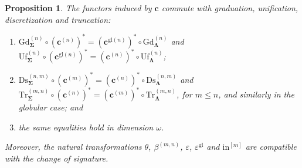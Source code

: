 \documentclass[a4paper,reqno]{amsart}
\newcommand{\sig}[1]{\mathbf{#1}}                %
\newcommand{\gl}{\mathrm{gl}}
\newcommand{\Gd}{\mathrm{Gd}}
\newcommand{\Uf}{\mathrm{Uf}}
\newcommand{\Ds}{\mathrm{Ds}}
\newcommand{\Tr}{\mathrm{Tr}}
\theoremstyle{plain}
\newtheorem{proposition}[theorem]{Proposition}
\theoremstyle{definition}
\begin{document}
\begin{proposition}\label{PChangeSigCompat}
The functors induced by $\mathbf{c}$ commute with graduation, unification, discretization and truncation:
\begin{enumerate}
\item $\Gd^{(n)}_{\sig{\Sigma}}\circ(\mathbf{c}^{(n)})^{\ast}=(\mathbf{c}^{\gl(n)})^{\ast}\circ\Gd^{(n)}_{\sig{\Lambda}}$ and $\Uf^{(n)}_{\sig{\Sigma}}\circ(\mathbf{c}^{\gl(n)})^{\ast}=(\mathbf{c}^{(n)})^{\ast}\circ\Uf^{(n)}_{\sig{\Lambda}}$;
\item $\Ds^{(n,m)}_{\sig{\Sigma}}\circ(\mathbf{c}^{(m)})^{\ast}=(\mathbf{c}^{(n)})^{\ast}\circ\Ds^{(n,m)}_{\sig{\Lambda}}$ and $\Tr^{(m,n)}_{\sig{\Sigma}}\circ(\mathbf{c}^{(n)})^{\ast}=(\mathbf{c}^{(m)})^{\ast}\circ\Tr^{(m,n)}_{\sig{\Lambda}}$, for $m\leq n$, and similarly in the globular case; and
\item the same equalities hold in dimension $\omega$.
\end{enumerate}
Moreover, the natural transformations $\theta$, $\beta^{(m,n)}$, $\varepsilon$, $\varepsilon^{\gl}$ and $\mathrm{in}^{[m]}$ are compatible with the change of signature.
\end{proposition}
\end{document}
